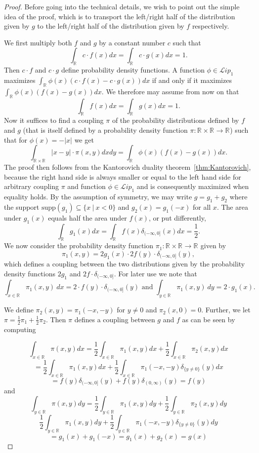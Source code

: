 \documentclass{article} %
\newcommand{\RR}[1][]{\mathbb{R}^{#1}}
\newcommand{\Li}[1]{\mathcal{L}ip_{#1}}
\newcommand{\supp}[1]{\text{supp}({#1})}
\begin{document}
\begin{proof}
Before going into the technical details, we wish to point out the simple idea of the proof, which is to transport the left/right half of the distribution given by $g$ to the left/right half of the distribution given by $f$ respectively.

We first multiply both ${f}$ and ${g}$ by a constant number $c$ such that $$ \int_{\RR} c\cdot {f}(x) dx =   \int_{\RR} c\cdot {g}(x) dx=1.$$ Then $c\cdot {f}$ and $c\cdot {g}$ define probability density functions. A function $\phi\in \Li{1}$ maximizes  $\int_{\RR}   \phi(x) (c \cdot  {f}(x)- c\cdot {g}(x) ) dx $ if and only if it maximizes $\int_{\RR}   \phi(x) (  {f}(x)-  {g}(x) ) dx $. We therefore may assume from now on that 
$$\int_{\RR} {f}(x) dx = \int_{\RR} {g}(x) dx=1.$$
Now it suffices to find a coupling $\pi$ of the probability distributions defined by $f$ and $g$ (that is itself defined by a probability density function $\pi:\RR\times \RR\rightarrow \RR$) such that for $\phi(x)=  -|x|$ we get $$\int_{\RR\times\RR} |x-y|\cdot  \pi(x,y) dx dy =  \int_{\RR} \phi(x) ( {f}(x)- {g}(x) ) dx.$$
The proof then follows from the Kantorovich duality theorem~\ref{thm:Kantorovich}, because the right hand side is always smaller or equal to the left hand side for arbitrary coupling $\pi$ and function $\phi\in \Li{1}$ and is consequently maximized when equality holds.  
By the assumption of symmetry, we may write ${g}={g}_1+{g}_2$ where the support $\supp{{g}_1}\subseteq \{x\ |\ x<0\}$ and ${g}_2(x)={g}_1(-x)$ for all $x$. The area under $g_1(x)$ equals half the area under $f(x)$, or put differently,
$$\int_{\RR} {g}_1(x) dx = \int_{\RR} f(x) \delta_{(-\infty, 0]}(x) dx=\frac{1}{2}.$$
We now consider the probability density function $\pi_1:\RR\times\RR\rightarrow \RR$ given by $$\pi_1(x,y)=2 {g}_1(x)\cdot 2 f(y)\cdot \delta_{(-\infty, 0]}(y),$$ which  defines a coupling between the two distributions given by the probability density functions $2 {g}_1$ and $2 f\cdot \delta_{(-\infty, 0]}$. For later use we note that
$$\int_{x\in\RR} \pi_1(x,y)\ dx=2\cdot f(y)\cdot  \delta_{(-\infty, 0]}(y)  \text{ and } \int_{y\in\RR} \pi_1(x,y)\ dy=2\cdot g_1(x).$$

We define $\pi_2(x,y)=\pi_1(-x,-y)$ for $y \neq 0$ and $\pi_2(x,0)=0$. Further, we let $\pi=\frac{1}{2}\pi_1+\frac{1}{2}\pi_2$.  Then $\pi$ defines a coupling between $g$ and $f$ as can be seen by computing

$$\int_{x\in \RR}\pi(x,y)dx =\frac{1}{2} \int_{x\in \RR}\pi_1(x,y)dx +  \frac{1}{2} \int_{x\in \RR}\pi_2(x,y)dx$$
$$=\frac{1}{2} \int_{x\in \RR}\pi_1(x,y)dx +  \frac{1}{2} \int_{x\in \RR}\pi_1(-x,-y)\delta_{\{y\neq 0\}}(y) dx$$
$$ = {f}(y) \delta_{(-\infty, 0]}(y) + {f}(y) \delta_{(0,\infty)}(y) = {f}(y) $$
and
$$\int_{y\in \RR}\pi(x,y)dy =\frac{1}{2} \int_{y\in \RR}\pi_1(x,y)dy +  \frac{1}{2} \int_{y\in \RR}\pi_2(x,y)dy$$
$$ \frac{1}{2} \int_{y\in \RR}\pi_1(x,y)dy +  \frac{1}{2} \int_{y\in \RR}\pi_1(-x,-y)\delta_{\{y\neq 0\} }(y)dy $$
$$ = {g}_1(x) + {g}_1(-x)  = {g}_1(x) + {g}_2(x) = {g}(x) $$



\end{proof}
\end{document}
